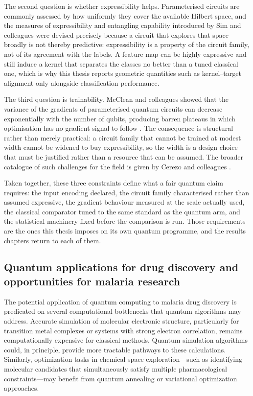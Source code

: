 The second question is whether expressibility helps. Parameterised circuits are commonly assessed by how uniformly they cover the available Hilbert space, and the measures of expressibility and entangling capability introduced by Sim and colleagues \cite{Sim2019} were devised precisely because a circuit that explores that space broadly is not thereby predictive: expressibility is a property of the circuit family, not of its agreement with the labels. A feature map can be highly expressive and still induce a kernel that separates the classes no better than a tuned classical one, which is why this thesis reports geometric quantities such as kernel--target alignment only alongside classification performance.

The third question is trainability. McClean and colleagues showed that the variance of the gradients of parameterised quantum circuits can decrease exponentially with the number of qubits, producing barren plateaus in which optimisation has no gradient signal to follow \cite{McClean2018}. The consequence is structural rather than merely practical: a circuit family that cannot be trained at modest width cannot be widened to buy expressibility, so the width is a design choice that must be justified rather than a resource that can be assumed. The broader catalogue of such challenges for the field is given by Cerezo and colleagues \cite{Cerezo2023}.

Taken together, these three constraints define what a fair quantum claim requires: the input encoding declared, the circuit family characterised rather than assumed expressive, the gradient behaviour measured at the scale actually used, the classical comparator tuned to the same standard as the quantum arm, and the statistical machinery fixed before the comparison is run. Those requirements are the ones this thesis imposes on its own quantum programme, and the results chapters return to each of them.

\subsection{Quantum applications for drug discovery and opportunities for malaria research}

The potential application of quantum computing to malaria drug discovery is predicated on several computational bottlenecks that quantum algorithms may address. Accurate simulation of molecular electronic structure, particularly for transition metal complexes or systems with strong electron correlation, remains computationally expensive for classical methods. Quantum simulation algorithms could, in principle, provide more tractable pathways to these calculations. Similarly, optimization tasks in chemical space exploration—such as identifying molecular candidates that simultaneously satisfy multiple pharmacological constraints—may benefit from quantum annealing or variational optimization approaches.


